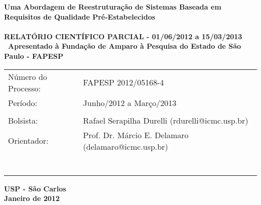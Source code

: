 \documentclass[a4paper,11pt]{article}
\begin{document}
\begin{center}
\vspace*{1cm}
{\fontsize{17.28}{20}\sffamily\bfseries\selectfont Uma Abordagem de Reestruturação de Sistemas Baseada em Requisitos de Qualidade Pré-Estabelecidos \\\ \\

\small{RELATÓRIO CIENTÍFICO PARCIAL - 01/06/2012 a 15/03/2013}\\ \
\textsf{Apresentado à Fundação de Amparo à Pesquisa do Estado de São Paulo - FAPESP}
 \\
\vspace{3cm}}


\begin{table}[!th]
  \begin{center}
    \begin{tabular}{ll}

	  Número do Processo:      &   FAPESP 2012/05168-4     \\
      Período:        &  Junho/2012 a Março/2013                    \\
	                   &                                \\
      Bolsista:           &  Rafael Serapilha Durelli (rdurelli@icmc.usp.br)                                     \\
	  
	  \vspace{0.6cm}
      Orientador:        &  Prof. Dr. Márcio E. Delamaro (delamaro@icmc.usp.br)                                           \\

	         &                              \\
	          &  \\
                       &                                  \\
       &                                       \\
              &                                             \\ \\
      \vspace{1cm}

    \end{tabular}
  \end{center}
\end{table}

\vfill
{\fontsize{18}{20}\sffamily\bfseries\selectfont USP - São Carlos \\ Janeiro de 2012}

\end{center}
\end{document}
